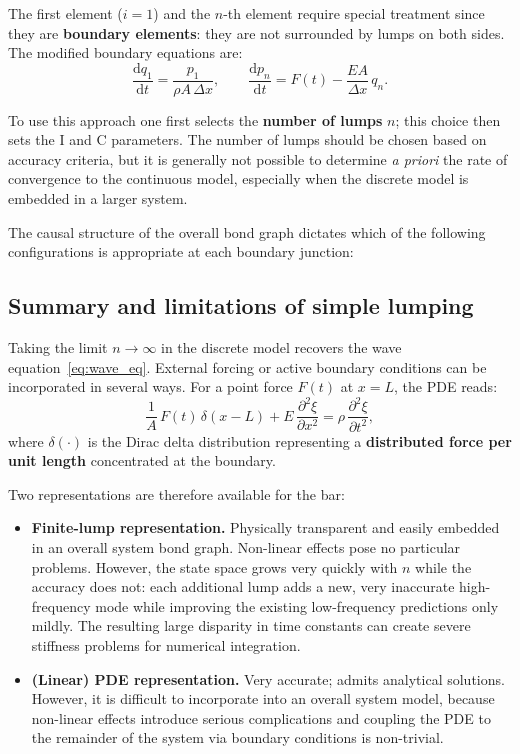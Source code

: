 The first element ($i=1$) and the $n$-th element require special treatment since
they are \textbf{boundary elements}: they are not surrounded by lumps on both
sides.  The modified boundary equations are:
\begin{equation}
  \frac{\mathrm{d}q_{1}}{\mathrm{d}t}
  = \frac{p_{1}}{\rho A\,\Delta x},
  \qquad
  \frac{\mathrm{d}p_{n}}{\mathrm{d}t}
  = F(t) - \frac{EA}{\Delta x}\,q_{n}.
\end{equation}

To use this approach one first selects the \textbf{number of lumps} $n$; this
choice then sets the I and C parameters.  The number of lumps should be chosen
based on accuracy criteria, but it is generally not possible to determine \emph{a
priori} the rate of convergence to the continuous model, especially when the
discrete model is embedded in a larger system.

The causal structure of the overall bond graph dictates which of the following
configurations is appropriate at each boundary junction:






\subsection{Summary and limitations of simple lumping}
\label{ssec:lumping_summary}

Taking the limit $n \to \infty$ in the discrete model recovers the wave
equation~\eqref{eq:wave_eq}.  External forcing or active boundary conditions
can be incorporated in several ways.  For a point force $F(t)$ at $x = L$,
the PDE reads:
\begin{equation}
  \frac{1}{A}\,F(t)\,\delta(x - L)
  + E\,\frac{\partial^{2}\xi}{\partial x^{2}}
  = \rho\,\frac{\partial^{2}\xi}{\partial t^{2}},
  \label{eq:wave_forced}
\end{equation}
where $\delta(\cdot)$ is the Dirac delta distribution representing a
\textbf{distributed force per unit length} concentrated at the boundary.

Two representations are therefore available for the bar:
\begin{itemize}[leftmargin=2em,itemsep=2pt]
  \item \textbf{Finite-lump representation.}  Physically transparent and easily
    embedded in an overall system bond graph.  Non-linear effects pose no
    particular problems.  However, the state space grows very quickly with $n$
    while the accuracy does not: each additional lump adds a new, very inaccurate
    high-frequency mode while improving the existing low-frequency predictions
    only mildly.  The resulting large disparity in time constants can create
    severe stiffness problems for numerical integration.
  \item \textbf{(Linear) PDE representation.}  Very accurate; admits analytical
    solutions.  However, it is difficult to incorporate into an overall system
    model, because non-linear effects introduce serious complications and coupling
    the PDE to the remainder of the system via boundary conditions is
    non-trivial.
\end{itemize}

